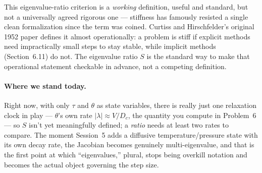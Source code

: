 \begin{remark}
This eigenvalue-ratio criterion is a \emph{working} definition, useful and standard, but not a universally agreed rigorous one --- stiffness has famously resisted a single clean formalization since the term was coined. Curtiss and Hirschfelder's original 1952 paper defines it almost operationally: a problem is stiff if explicit methods need impractically small steps to stay stable, while implicit methods (Section~6.11) do not. The eigenvalue ratio $S$ is the standard way to make that operational statement checkable in advance, not a competing definition.
\end{remark}

\paragraph{Where we stand today.} Right now, with only $\tau$ and $\theta$ as state variables, there is really just one relaxation clock in play --- $\theta$'s own rate $|\lambda|\approx V/D_c$, the quantity you compute in Problem~6 --- so $S$ isn't yet meaningfully defined; a \emph{ratio} needs at least two rates to compare. The moment Session~5 adds a diffusive temperature/pressure state with its own decay rate, the Jacobian becomes genuinely multi-eigenvalue, and that is the first point at which ``eigenvalues,'' plural, stops being overkill notation and becomes the actual object governing the step size.

\begin{center}
\end{center}

